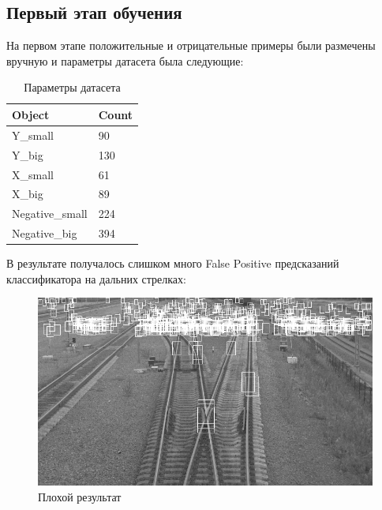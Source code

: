 \subsection{Первый этап обучения}
На первом этапе положительные и отрицательные примеры были размечены вручную и параметры датасета была следующие:
\begin{table}[h!]
	\begin{tabular}{|l|l|}
		\hline
		\textbf{Object}    & \textbf{Count} \\ \hline
		Y\_small        & 90             \\ \hline
		Y\_big          & 130            \\ \hline
		X\_small        & 61             \\ \hline
		X\_big          & 89             \\ \hline
		Negative\_small & 224            \\ \hline
		Negative\_big   & 394            \\ \hline
	\end{tabular}
	\label{tab:params1}
	\caption{Параметры датасета}
\end{table}
\newline
В результате получалось слишком много False Positive предсказаний классификатора на дальних стрелках:
\begin{figure}[h!]
	\centering
	\includegraphics[width=0.7\linewidth]{pictures/screenshot32}
	\caption{Плохой результат}
	\label{fig:screenshot32}
\end{figure}

